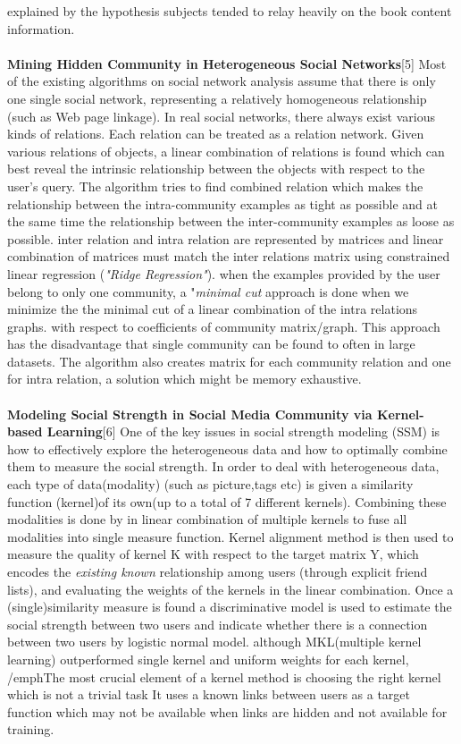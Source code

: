 \documentclass[a4paper]{article}
\begin{document}
explained by the hypothesis subjects tended to relay heavily on the book content information.
\\ 
\\ 
\textbf{ Mining Hidden Community in Heterogeneous Social Networks}[5]
Most of the existing algorithms on social network analysis assume that there is only one single social network, representing a relatively homogeneous relationship (such as Web page linkage). In real social networks, there always exist various kinds of relations. Each relation can be treated as a relation network.
Given various relations of objects, a linear combination of relations is found which can best reveal the intrinsic relationship between the objects with respect to the user's query.
The algorithm tries to  find  combined relation which makes the relationship between the
 intra-community examples as tight as possible and at the same time the relationship between the inter-community examples as loose as possible.
inter relation and intra relation are represented by matrices and linear combination of matrices must match the inter relations matrix using constrained linear regression (\emph{"Ridge Regression"}).
when the examples provided by the user belong to only one community, a "\emph{minimal cut }  approach is done 
when we minimize the the minimal cut of a linear combination of the intra relations graphs.
with respect to coefficients of community matrix/graph.
This approach  has the disadvantage that single community can be found to often in large datasets.
The algorithm also creates  matrix for each community relation and one for intra relation, a solution which might be memory exhaustive. 
 \\
\\
\textbf{Modeling Social Strength in Social Media Community via Kernel-based Learning}[6]
One of the key issues in social strength modeling (SSM) is how to effectively explore the heterogeneous data and how to optimally combine them to measure the social strength.
In order to deal with heterogeneous data, each type of data(modality) (such as picture,tags etc) is given a similarity function (kernel)of its own(up to a total of 7 different kernels).
Combining these modalities  is done by in linear combination of multiple kernels to fuse all modalities into single measure function.
Kernel alignment method is then used to measure the quality of kernel K with respect to the target matrix Y,  which encodes the \emph{existing known} relationship among users (through explicit friend lists), and evaluating the weights of the kernels in the linear combination.
Once a (single)similarity measure is found  a discriminative model is used to estimate the social strength between two users and indicate whether there is a connection between two users by logistic normal model.
although MKL(multiple kernel learning) outperformed single kernel and uniform weights for each kernel,
/emph{The most crucial element of a kernel method  is choosing the right kernel which is not a trivial task
It uses a known links between users as a target function which may not be available when links are hidden and not available for training}.
\end{document}
